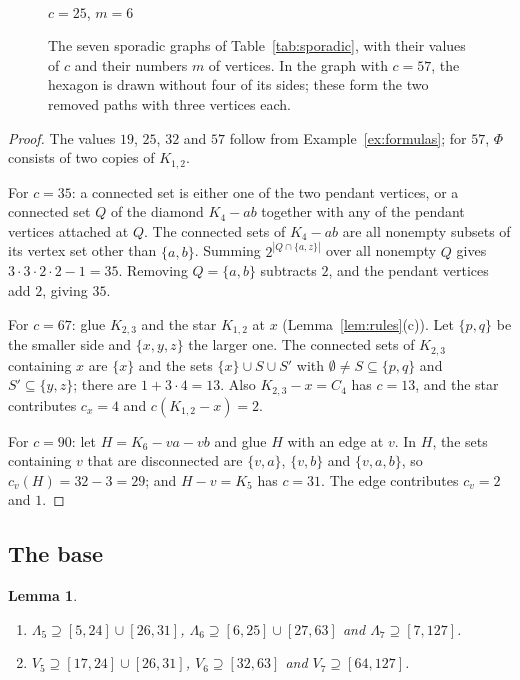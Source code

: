 \documentclass[11pt]{amsart}
\newtheorem{lemma}[theorem]{Lemma}
\theoremstyle{definition}
\theoremstyle{remark}
\newcommand{\Lam}{\Lambda}
\begin{document}
\begin{figure}[ht]
\begin{minipage}[b]{0.24\textwidth}
\\[2pt]{\small $c=25$, $m=6$}
\end{minipage}
\caption{The seven sporadic graphs of Table~\ref{tab:sporadic}, with their values of $c$ and their numbers $m$ of vertices. In the graph with $c=57$, the hexagon is drawn without four of its sides; these form the two removed paths with three vertices each.}
\label{fig:sporadic}
\end{figure}

\begin{proof}
The values $19$, $25$, $32$ and $57$ follow from Example~\ref{ex:formulas}; for $57$, $\Phi$ consists of two copies of $K_{1,2}$.

For $c=35$: a connected set is either one of the two pendant vertices, or a connected set $Q$ of the diamond $K_4-ab$ together with any of the pendant vertices attached at $Q$. The connected sets of $K_4-ab$ are all nonempty subsets of its vertex set other than $\{a,b\}$. Summing $2^{|Q\cap\{a,z\}|}$ over all nonempty $Q$ gives $3\cdot3\cdot2\cdot2-1=35$. Removing $Q=\{a,b\}$ subtracts $2$, and the pendant vertices add $2$, giving $35$.

For $c=67$: glue $K_{2,3}$ and the star $K_{1,2}$ at $x$ (Lemma~\ref{lem:rules}(c)). Let $\{p,q\}$ be the smaller side and $\{x,y,z\}$ the larger one. The connected sets of $K_{2,3}$ containing $x$ are $\{x\}$ and the sets $\{x\}\cup S\cup S'$ with $\emptyset\ne S\subseteq\{p,q\}$ and $S'\subseteq\{y,z\}$; there are $1+3\cdot4=13$. Also $K_{2,3}-x=C_4$ has $c=13$, and the star contributes $c_x=4$ and $c(K_{1,2}-x)=2$.

For $c=90$: let $H=K_6-va-vb$ and glue $H$ with an edge at $v$. In $H$, the sets containing $v$ that are disconnected are $\{v,a\}$, $\{v,b\}$ and $\{v,a,b\}$, so $c_v(H)=32-3=29$; and $H-v=K_5$ has $c=31$. The edge contributes $c_v=2$ and $1$.
\end{proof}

\subsection{The base}

\begin{lemma}\label{lem:base}
\begin{enumerate}[label=\textup{(\alph*)}]
\item $\Lam_5\supseteq[5,24]\cup[26,31]$, $\Lam_6\supseteq[6,25]\cup[27,63]$ and $\Lam_7\supseteq[7,127]$.
\item $V_5\supseteq[17,24]\cup[26,31]$, $V_6\supseteq[32,63]$ and $V_7\supseteq[64,127]$.
\end{enumerate}
\end{lemma}
\end{document}
